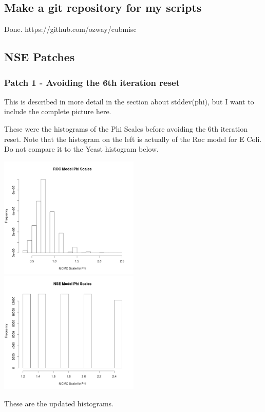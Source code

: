 \subsection{Make a git repository for my scripts}

Done. https://github.com/ozway/cubmisc

\subsection{NSE Patches}

\subsubsection{Patch 1 - Avoiding the 6th iteration reset}

This is described in more detail in the section about stddev(phi), but I want to include the complete picture here.

These were the histograms of the Phi Scales before avoiding the 6th iteration reset. Note that the histogram on the left is actually of the Roc model for E Coli. Do not compare it to the Yeast histogram below.

\includegraphics[width=0.5\textwidth]{data/oct10-roc-scalehist.png}
\includegraphics[width=0.5\textwidth]{data/oct10-nse-scalehist.png}


These are the updated histograms.

